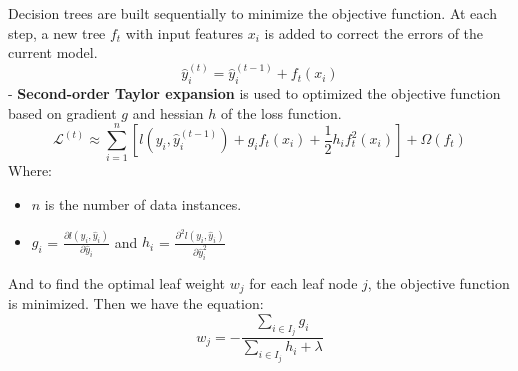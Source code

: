 \documentclass{ieeeojies}
\begin{document}
Decision trees are built sequentially to minimize the objective function. At each step, a new tree \(f_t\) with input features \(x_i\) is added to correct the errors of the current model.
\begin{dmath*}
    \hat{y}_i^{(t)} = \hat{y}_i^{(t-1)} + f_t(x_i)
\end{dmath*}
- \textbf{Second-order Taylor expansion} is used to optimized the objective function based on gradient \(g\) and hessian \(h\) of the loss function.
\begin{dmath*}
    \mathcal{L}^{(t)} \approx \sum_{i=1}^n [l(y_i, \hat{y}_i^{(t-1)}) + g_i f_t(x_i) + \frac{1}{2} h_i f_t^2(x_i)] + \Omega(f_t)
\end{dmath*}
Where:
\begin{itemize}
    \item \(n\) is the number of data instances.
    \item \(g_i\) = \(\frac{\partial l(y_i, \hat{y}_i)}{\partial \hat{y}_i}\) and \(h_i\) = \(\frac{\partial^2 l(y_i, \hat{y}_i)}{\partial \hat{y}_i^2}\)
\end{itemize}
And to find the optimal leaf weight \(w_j\) for each leaf node \(j\), the objective function is minimized. Then we have the equation:
\begin{dmath*}
    w_j = -\frac{\sum_{i \in I_j} g_i}{\sum_{i \in I_j} h_i + \lambda}
\end{dmath*}
\end{document}
